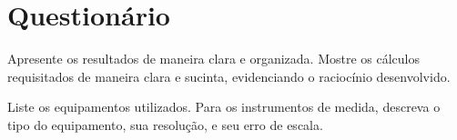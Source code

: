 \cleardoublepage


\vspace{15mm}

\begin{fullwidth}
\noindent{}
\vspace{5mm}

\noindent{}

\noindent{}

\noindent{}

\noindent{}

\noindent{}
\end{fullwidth}

\vspace{5mm}

\section{Questionário}

\begin{question}[type={exam}]{1}
Apresente os resultados de maneira clara e organizada. Mostre os cálculos requisitados de maneira clara e sucinta, evidenciando o raciocínio desenvolvido.
\end{question}

\begin{question}[type={exam}]{0.5}
Liste os equipamentos utilizados. Para os instrumentos de medida, descreva o tipo do equipamento, sua resolução, e seu erro de escala.
\end{question}

